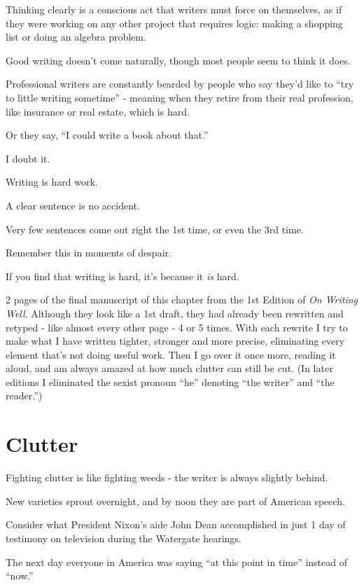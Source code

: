 \documentclass{book}
\numberwithin{equation}{section}
\begin{document}
Thinking clearly is a conscious act that writers must force on themselves, as if they were working on any other project that requires logic: making a shopping list or doing an algebra problem.

Good writing doesn't come naturally, though most people seem to think it does.

Professional writers are constantly bearded by people who say they'd like to ``try to little writing sometime'' - meaning when they retire from their real profession, like insurance or real estate, which is hard.

Or they say, ``I could write a book about that.''

I doubt it.

%
Writing is hard work.

A clear sentence is no accident.

Very few sentences come out right the 1st time, or even the 3rd time.

Remember this in moments of despair.

If you find that writing is hard, it's because it \textit{is} hard.

\textsf{2 pages of the final manuscript of this chapter from the 1st Edition of \textit{On Writing Well}. Although they look like a 1st draft, they had already been rewritten and retyped - like almost every other page - 4 or 5 times. With each rewrite I try to make what I have written tighter, stronger and more precise, eliminating every element that's not doing useful work. Then I go over it once more, reading it aloud, and am always amazed at how much clutter can still be cut. (In later editions I eliminated the sexist pronoun ``he'' denoting ``the writer'' and ``the reader.'')}



\chapter{Clutter}

Fighting clutter is like fighting weeds - the writer is always slightly behind.

New varieties sprout overnight, and by noon they are part of American speech.

Consider what President Nixon's aide John Dean accomplished in just 1 day of testimony on television during the Watergate hearings.

The next day everyone in America was saying ``at this point in time'' instead of ``now.''
\end{document}
